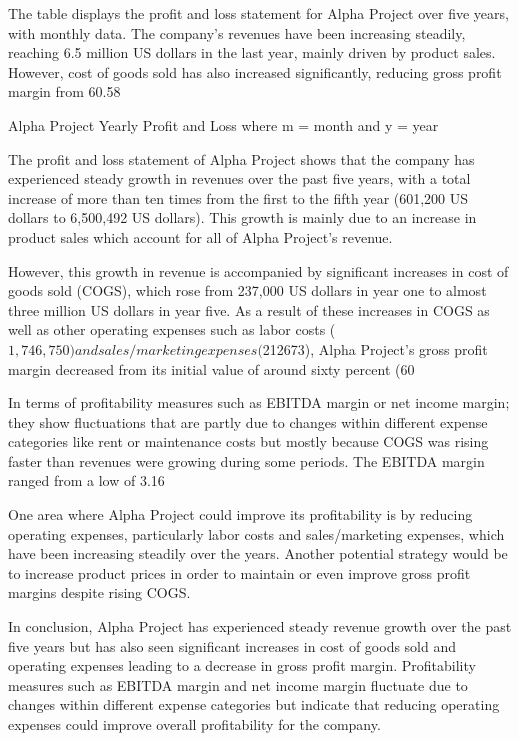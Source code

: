 The table displays the profit and loss statement for Alpha Project over five years, with monthly data. The company's revenues have been increasing steadily, reaching 6.5 million US dollars in the last year, mainly driven by product sales. However, cost of goods sold has also increased significantly, reducing gross profit margin from 60.58%

Alpha Project Yearly Profit and Loss where m = month and y = year

The profit and loss statement of Alpha Project shows that the company has experienced steady growth in revenues over the past five years, with a total increase of more than ten times from the first to the fifth year (601,200 US dollars to 6,500,492 US dollars). This growth is mainly due to an increase in product sales which account for all of Alpha Project's revenue.

However, this growth in revenue is accompanied by significant increases in cost of goods sold (COGS), which rose from 237,000 US dollars in year one to almost three million US dollars in year five. As a result of these increases in COGS as well as other operating expenses such as labor costs ($1,746,750) and sales/marketing expenses ($212673), Alpha Project's gross profit margin decreased from its initial value of around sixty percent (60%

In terms of profitability measures such as EBITDA margin or net income margin; they show fluctuations that are partly due to changes within different expense categories like rent or maintenance costs but mostly because COGS was rising faster than revenues were growing during some periods. The EBITDA margin ranged from a low of 3.16%

One area where Alpha Project could improve its profitability is by reducing operating expenses, particularly labor costs and sales/marketing expenses, which have been increasing steadily over the years. Another potential strategy would be to increase product prices in order to maintain or even improve gross profit margins despite rising COGS.

In conclusion, Alpha Project has experienced steady revenue growth over the past five years but has also seen significant increases in cost of goods sold and operating expenses leading to a decrease in gross profit margin. Profitability measures such as EBITDA margin and net income margin fluctuate due to changes within different expense categories but indicate that reducing operating expenses could improve overall profitability for the company.